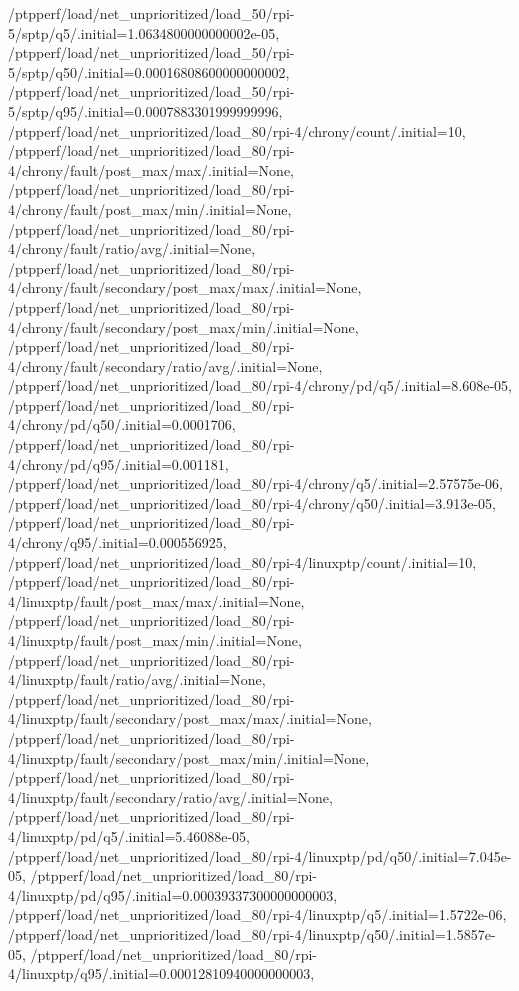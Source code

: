 {    /ptpperf/load/net_unprioritized/load_50/rpi-5/sptp/q5/.initial=1.0634800000000002e-05,
    /ptpperf/load/net_unprioritized/load_50/rpi-5/sptp/q50/.initial=0.00016808600000000002,
    /ptpperf/load/net_unprioritized/load_50/rpi-5/sptp/q95/.initial=0.0007883301999999996,
    /ptpperf/load/net_unprioritized/load_80/rpi-4/chrony/count/.initial=10,
    /ptpperf/load/net_unprioritized/load_80/rpi-4/chrony/fault/post_max/max/.initial=None,
    /ptpperf/load/net_unprioritized/load_80/rpi-4/chrony/fault/post_max/min/.initial=None,
    /ptpperf/load/net_unprioritized/load_80/rpi-4/chrony/fault/ratio/avg/.initial=None,
    /ptpperf/load/net_unprioritized/load_80/rpi-4/chrony/fault/secondary/post_max/max/.initial=None,
    /ptpperf/load/net_unprioritized/load_80/rpi-4/chrony/fault/secondary/post_max/min/.initial=None,
    /ptpperf/load/net_unprioritized/load_80/rpi-4/chrony/fault/secondary/ratio/avg/.initial=None,
    /ptpperf/load/net_unprioritized/load_80/rpi-4/chrony/pd/q5/.initial=8.608e-05,
    /ptpperf/load/net_unprioritized/load_80/rpi-4/chrony/pd/q50/.initial=0.0001706,
    /ptpperf/load/net_unprioritized/load_80/rpi-4/chrony/pd/q95/.initial=0.001181,
    /ptpperf/load/net_unprioritized/load_80/rpi-4/chrony/q5/.initial=2.57575e-06,
    /ptpperf/load/net_unprioritized/load_80/rpi-4/chrony/q50/.initial=3.913e-05,
    /ptpperf/load/net_unprioritized/load_80/rpi-4/chrony/q95/.initial=0.000556925,
    /ptpperf/load/net_unprioritized/load_80/rpi-4/linuxptp/count/.initial=10,
    /ptpperf/load/net_unprioritized/load_80/rpi-4/linuxptp/fault/post_max/max/.initial=None,
    /ptpperf/load/net_unprioritized/load_80/rpi-4/linuxptp/fault/post_max/min/.initial=None,
    /ptpperf/load/net_unprioritized/load_80/rpi-4/linuxptp/fault/ratio/avg/.initial=None,
    /ptpperf/load/net_unprioritized/load_80/rpi-4/linuxptp/fault/secondary/post_max/max/.initial=None,
    /ptpperf/load/net_unprioritized/load_80/rpi-4/linuxptp/fault/secondary/post_max/min/.initial=None,
    /ptpperf/load/net_unprioritized/load_80/rpi-4/linuxptp/fault/secondary/ratio/avg/.initial=None,
    /ptpperf/load/net_unprioritized/load_80/rpi-4/linuxptp/pd/q5/.initial=5.46088e-05,
    /ptpperf/load/net_unprioritized/load_80/rpi-4/linuxptp/pd/q50/.initial=7.045e-05,
    /ptpperf/load/net_unprioritized/load_80/rpi-4/linuxptp/pd/q95/.initial=0.00039337300000000003,
    /ptpperf/load/net_unprioritized/load_80/rpi-4/linuxptp/q5/.initial=1.5722e-06,
    /ptpperf/load/net_unprioritized/load_80/rpi-4/linuxptp/q50/.initial=1.5857e-05,
    /ptpperf/load/net_unprioritized/load_80/rpi-4/linuxptp/q95/.initial=0.00012810940000000003,
}
